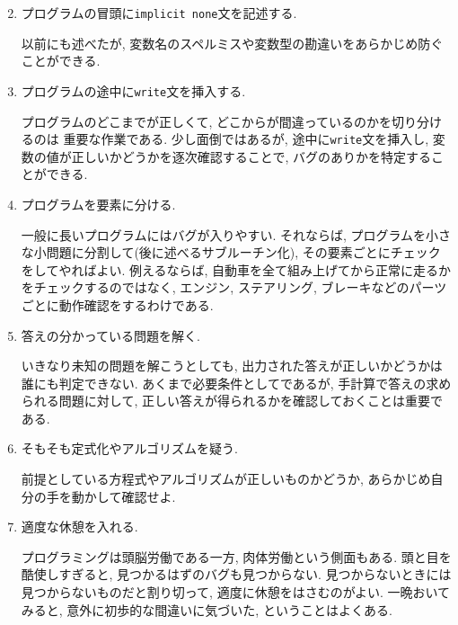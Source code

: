 \begin{enumerate}
\setcounter{enumi}{1}
\item プログラムの冒頭に\verb|implicit none|文を記述する. 

以前にも述べたが, 
変数名のスペルミスや変数型の勘違いをあらかじめ防ぐことができる. 

\item プログラムの途中に\verb|write|文を挿入する. 

プログラムのどこまでが正しくて, どこからが間違っているのかを切り分けるのは
重要な作業である. 
少し面倒ではあるが, 途中に\verb|write|文を挿入し, 変数の値が正しいかどうかを逐次確認することで, 
バグのありかを特定することができる. 

\item プログラムを要素に分ける. 

一般に長いプログラムにはバグが入りやすい. 
それならば, プログラムを小さな小問題に分割して(後に述べるサブルーチン化), 
その要素ごとにチェックをしてやればよい. 
例えるならば, 自動車を全て組み上げてから正常に走るかをチェックするのではなく, 
エンジン, ステアリング, ブレーキなどのパーツごとに動作確認をするわけである. 

\item 答えの分かっている問題を解く. 

いきなり未知の問題を解こうとしても, 出力された答えが正しいかどうかは誰にも判定できない. 
あくまで必要条件としてであるが, 手計算で答えの求められる問題に対して, 
正しい答えが得られるかを確認しておくことは重要である. 

\item そもそも定式化やアルゴリズムを疑う. 

前提としている方程式やアルゴリズムが正しいものかどうか, 
あらかじめ自分の手を動かして確認せよ. 

\item 適度な休憩を入れる. 

プログラミングは頭脳労働である一方, 肉体労働という側面もある. 
頭と目を酷使しすぎると, 見つかるはずのバグも見つからない. 
見つからないときには見つからないものだと割り切って, 適度に休憩をはさむのがよい. 
一晩おいてみると, 意外に初歩的な間違いに気づいた, ということはよくある. 

\end{enumerate}




\begin{comment}
Fortranは文字も変数として扱うことができる(文字型: character).
文字の長さはcharacter(len=5)などとして指定する.
次のプログラムは文字型を扱った例である.



\subsection*{$<$演習課題$>$}
二辺の長さとそれらのなす角度を読み取り, その三角形の面積を計算するプログラムを作成せよ. \\
\end{comment}

\begin{comment}
異なる型同士の演算は文法エラーではないが,
避けることが望ましい.
以下のプログラムは, 整数型, 実数型, 複素数型間の型変換の例である.

\end{comment}

